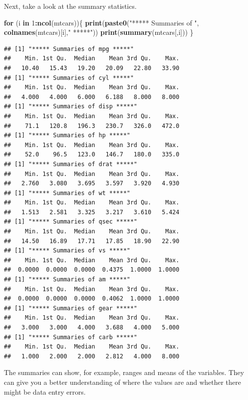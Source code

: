 \documentclass[
]{book}
\newenvironment{Shaded}{\begin{snugshade}}{\end{snugshade}}
\newcommand{\ControlFlowTok}[1]{\textcolor[rgb]{0.13,0.29,0.53}{\textbf{#1}}}
\newcommand{\DecValTok}[1]{\textcolor[rgb]{0.00,0.00,0.81}{#1}}
\newcommand{\FunctionTok}[1]{\textcolor[rgb]{0.13,0.29,0.53}{\textbf{#1}}}
\newcommand{\NormalTok}[1]{#1}
\newcommand{\SpecialCharTok}[1]{\textcolor[rgb]{0.81,0.36,0.00}{\textbf{#1}}}
\newcommand{\StringTok}[1]{\textcolor[rgb]{0.31,0.60,0.02}{#1}}
\begin{document}
Next, take a look at the summary statistics.

\begin{Shaded}
\begin{Highlighting}[]
\ControlFlowTok{for}\NormalTok{ (i }\ControlFlowTok{in} \DecValTok{1}\SpecialCharTok{:}\FunctionTok{ncol}\NormalTok{(mtcars))\{}
  \FunctionTok{print}\NormalTok{(}\FunctionTok{paste0}\NormalTok{(}\StringTok{"***** Summaries of "}\NormalTok{, }\FunctionTok{colnames}\NormalTok{(mtcars)[i],}\StringTok{" *****"}\NormalTok{))}
  \FunctionTok{print}\NormalTok{(}\FunctionTok{summary}\NormalTok{(mtcars[,i]))}
\NormalTok{\}}
\end{Highlighting}
\end{Shaded}

\begin{verbatim}
## [1] "***** Summaries of mpg *****"
##    Min. 1st Qu.  Median    Mean 3rd Qu.    Max. 
##   10.40   15.43   19.20   20.09   22.80   33.90 
## [1] "***** Summaries of cyl *****"
##    Min. 1st Qu.  Median    Mean 3rd Qu.    Max. 
##   4.000   4.000   6.000   6.188   8.000   8.000 
## [1] "***** Summaries of disp *****"
##    Min. 1st Qu.  Median    Mean 3rd Qu.    Max. 
##    71.1   120.8   196.3   230.7   326.0   472.0 
## [1] "***** Summaries of hp *****"
##    Min. 1st Qu.  Median    Mean 3rd Qu.    Max. 
##    52.0    96.5   123.0   146.7   180.0   335.0 
## [1] "***** Summaries of drat *****"
##    Min. 1st Qu.  Median    Mean 3rd Qu.    Max. 
##   2.760   3.080   3.695   3.597   3.920   4.930 
## [1] "***** Summaries of wt *****"
##    Min. 1st Qu.  Median    Mean 3rd Qu.    Max. 
##   1.513   2.581   3.325   3.217   3.610   5.424 
## [1] "***** Summaries of qsec *****"
##    Min. 1st Qu.  Median    Mean 3rd Qu.    Max. 
##   14.50   16.89   17.71   17.85   18.90   22.90 
## [1] "***** Summaries of vs *****"
##    Min. 1st Qu.  Median    Mean 3rd Qu.    Max. 
##  0.0000  0.0000  0.0000  0.4375  1.0000  1.0000 
## [1] "***** Summaries of am *****"
##    Min. 1st Qu.  Median    Mean 3rd Qu.    Max. 
##  0.0000  0.0000  0.0000  0.4062  1.0000  1.0000 
## [1] "***** Summaries of gear *****"
##    Min. 1st Qu.  Median    Mean 3rd Qu.    Max. 
##   3.000   3.000   4.000   3.688   4.000   5.000 
## [1] "***** Summaries of carb *****"
##    Min. 1st Qu.  Median    Mean 3rd Qu.    Max. 
##   1.000   2.000   2.000   2.812   4.000   8.000
\end{verbatim}

The summaries can show, for example, ranges and means of the variables. They can give you a better understanding of where the values are and whether there might be data entry errors.
\end{document}
